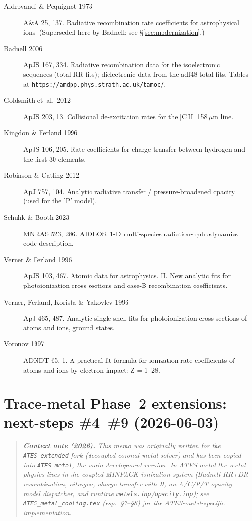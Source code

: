 \documentclass[english,a4paper]{kiseon_memo}
\begin{document}
\begin{description}
  \item[Aldrovandi \& Pequignot 1973] A\&A 25, 137.  Radiative
    recombination rate coefficients for astrophysical ions.
    (Superseded here by Badnell; see \S\ref{sec:modernization}.)
  \item[Badnell 2006] ApJS 167, 334.  Radiative recombination data
    for the isoelectronic sequences (total RR fits); dielectronic data
    from the adf48 total fits.  Tables at
    \texttt{https://amdpp.phys.strath.ac.uk/tamoc/}.
  \item[Goldsmith et~al.~2012] ApJS 203, 13.  Collisional
    de-excitation rates for the [C\,II] 158\,$\mu$m line.
  \item[Kingdon \& Ferland 1996] ApJS 106, 205.  Rate coefficients for
    charge transfer between hydrogen and the first 30 elements.
  \item[Robinson \& Catling 2012] ApJ 757, 104.  Analytic radiative
    transfer / pressure-broadened opacity (used for the 'P' model).
  \item[Schulik \& Booth 2023] MNRAS 523, 286.  AIOLOS:
    1-D multi-species radiation-hydrodynamics code description.
  \item[Verner \& Ferland 1996] ApJS 103, 467.  Atomic data for
    astrophysics. II. New analytic fits for photoionization cross
    sections and case-B recombination coefficients.
  \item[Verner, Ferland, Korista \& Yakovlev 1996] ApJ 465, 487.
    Analytic single-shell fits for photoionization cross sections of
    atoms and ions, ground states.
  \item[Voronov 1997] ADNDT 65, 1.  A practical fit formula for
    ionization rate coefficients of atoms and ions by electron
    impact: Z = 1--28.
\end{description}


\part{Trace-metal Phase~2 extensions: next-steps \#4--\#9 (2026-06-03)}

\begin{quote}\small\itshape
\textbf{Context note (2026).} This memo was originally written for the
\texttt{ATES\_extended} fork (decoupled coronal metal solver) and has
been copied into \texttt{ATES-metal}, the main development version. In
ATES-metal the metal physics lives in the coupled MINPACK ionization
system (Badnell RR+DR recombination, nitrogen, charge transfer with H,
an A/C/P/T opacity-model dispatcher, and runtime
\texttt{metals.inp}/\texttt{opacity.inp}); see
\texttt{ATES\_metal\_cooling.tex} (esp.\ \S7--\S8) for the
ATES-metal-specific implementation.
\end{quote}
\end{document}
